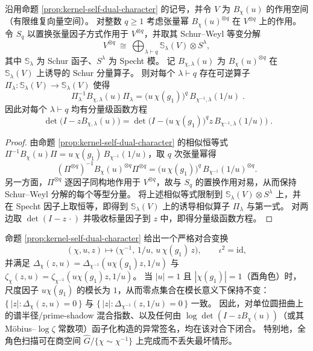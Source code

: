 \begin{theorem}\label{thm:kernel-self-dual-character-schur}
沿用命题 \ref{prop:kernel-self-dual-character} 的记号，并令 \(V\) 为 \(B_\chi(u)\) 的作用空间（有限维复向量空间）。
对整数 \(q\ge 1\) 考虑张量幂 \(B_\chi(u)^{\otimes q}\) 在 \(V^{\otimes q}\) 上的作用。
令 \(S_q\) 以置换张量因子方式作用于 \(V^{\otimes q}\)，并取其 Schur--Weyl 等变分解
\[
V^{\otimes q}\ \cong\ \bigoplus_{\lambda\vdash q}\mathbb S_\lambda(V)\otimes S^\lambda,
\]
其中 \(\mathbb S_\lambda\) 为 Schur 函子、\(S^\lambda\) 为 Specht 模。
记 \(B_{\chi,\lambda}(u)\) 为 \(B_\chi(u)^{\otimes q}\) 在 \(\mathbb S_\lambda(V)\) 上诱导的 Schur 分量算子。
则对每个 \(\lambda\vdash q\) 存在可逆算子 \(\Pi_\lambda:\mathbb S_\lambda(V)\to\mathbb S_\lambda(V)\) 使得
\[
\boxed{\;
\Pi_\lambda^{-1}B_{\chi,\lambda}(u)\Pi_\lambda
=\bigl(u\,\chi(g_1)\bigr)^{q}\,B_{\chi^{-1},\lambda}(1/u)\; }.
\]
因此对每个 \(\lambda\vdash q\) 均有分量级函数方程
\[
\boxed{\;
\det\!\bigl(I-zB_{\chi,\lambda}(u)\bigr)
=
\det\!\bigl(I-\bigl(u\,\chi(g_1)\bigr)^{q}z\,B_{\chi^{-1},\lambda}(1/u)\bigr)\; }.
\]
\end{theorem}
\begin{proof}
由命题 \ref{prop:kernel-self-dual-character} 的相似恒等式
\(
\Pi^{-1}B_\chi(u)\Pi=u\,\chi(g_1)\,B_{\chi^{-1}}(1/u)
\)，取 \(q\) 次张量幂得
\[
(\Pi^{\otimes q})^{-1}B_\chi(u)^{\otimes q}\Pi^{\otimes q}
=\bigl(u\,\chi(g_1)\bigr)^q\,B_{\chi^{-1}}(1/u)^{\otimes q}.
\]
另一方面，\(\Pi^{\otimes q}\) 逐因子同构地作用于 \(V^{\otimes q}\)，故与 \(S_q\) 的置换作用对易，从而保持 Schur--Weyl 分解的每个等型分量。
将上述相似等式限制到 \(\mathbb S_\lambda(V)\otimes S^\lambda\) 上，并在 Specht 因子上取恒等，即得到 \(\mathbb S_\lambda(V)\) 上的诱导相似算子 \(\Pi_\lambda\) 与第一式。
对两边取 \(\det(I-z\,\cdot)\) 并吸收标量因子到 \(z\) 中，即得分量级函数方程。
\end{proof}

\begin{remark}\label{rem:kernel-self-dual-character-dihedral}
命题 \ref{prop:kernel-self-dual-character} 给出一个严格对合变换
\[
(\chi,u,z)\longmapsto\bigl(\chi^{-1},\,1/u,\,u\,\chi(g_1)\,z\bigr),
\qquad \iota^2=\mathrm{id},
\]
并满足 \(\Delta_\chi(z,u)=\Delta_{\chi^{-1}}(u\chi(g_1)z,1/u)\) 与 \(\zeta_\chi(z,u)=\zeta_{\chi^{-1}}(u\chi(g_1)z,1/u)\)。
当 \(|u|=1\) 且 \(|\chi(g_1)|=1\)（酉角色）时，尺度因子 \(u\chi(g_1)\) 的模长为 \(1\)，从而零点集合在模长意义下保持不变：\(\{\,|z|:\Delta_\chi(z,u)=0\,\}\) 与 \(\{\,|z|:\Delta_{\chi^{-1}}(z,1/u)=0\,\}\) 一致。
因此，对单位圆扭曲上的谱半径/prime-shadow 混合指数、以及任何由 \(\log\det(I-zB_\chi(u))\)（或其 Möbius--\(\log\zeta\) 常数项）函子化构造的异常签名，均在该对合下闭合。
特别地，全角色扫描可在商空间 \(\widehat G/\{\chi\sim\chi^{-1}\}\) 上完成而不丢失最坏情形。
\end{remark}

